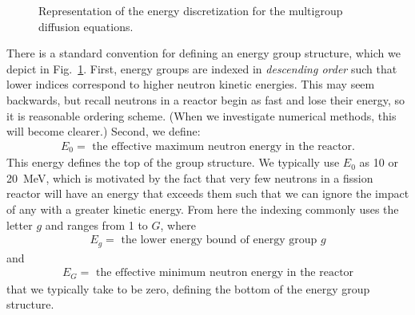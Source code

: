 \begin{figure}[tb!]
\begin{center}
\caption{Representation of the energy discretization for the multigroup diffusion equations.}
\label{Fig:neutronics_energyGroupStructure}
\end{center}
\end{figure}

There is a standard convention for defining an energy group structure, which we depict in Fig.~\ref{Fig:neutronics_energyGroupStructure}. First, energy groups are indexed in \emph{descending order} such that lower indices correspond to higher neutron kinetic energies. This may seem backwards, but recall neutrons in a reactor begin as fast and lose their energy, so it is reasonable ordering scheme. (When we investigate numerical methods, this will become clearer.) Second, we define:
\begin{align}
  E_0 = \text{ the effective maximum neutron energy in the reactor.} \nonumber
\end{align}
This energy defines the top of the group structure. We typically use $E_0$ as 10 or 20~MeV, which is motivated by the fact that very few neutrons in a fission reactor will have an energy that exceeds them such that we can ignore the impact of any with a greater kinetic energy. From here the indexing commonly uses the letter $g$ and ranges from 1 to $G$, where
\begin{align}
  E_g = \text{ the lower energy bound of energy group $g$} \nonumber
\end{align}
and
\begin{align}
  E_G = \text{ the effective minimum neutron energy in the reactor} \nonumber
\end{align}
that we typically take to be zero, defining the bottom of the energy group structure.

